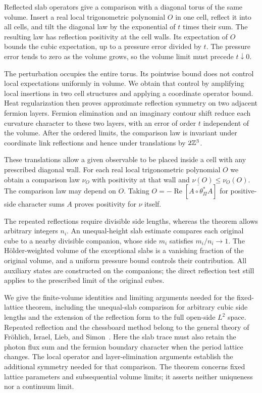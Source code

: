 Reflected slab operators give a comparison with a diagonal torus
of the same volume. Insert a real local trigonometric polynomial
$O$ in one cell, reflect it into all cells, and tilt the diagonal
law by the exponential of $t$ times their sum. The resulting law
has reflection positivity at the cell walls. Its expectation of
$O$ bounds the cubic expectation, up to a pressure error divided
by $t$. The pressure error tends to zero as the volume grows, so
the volume limit must precede $t\downarrow0$.

The perturbation occupies the entire torus. Its pointwise bound
does not control local expectations uniformly in volume. We obtain
that control by amplifying local insertions in two cell structures
and applying a coordinate operator bound. Heat regularization then
proves approximate reflection symmetry on two adjacent fermion
layers. Fermion elimination and an imaginary contour shift reduce
each curvature character to these two layers, with an error of
order $t$ independent of the volume. After the ordered limits,
the comparison law is invariant under coordinate link reflections
and hence under translations by $2\mathbb Z^3$.

These translations allow a given observable to be placed inside a
cell with any prescribed diagonal wall. For each real local
trigonometric polynomial $O$ we obtain a comparison law $\nu_O$
with positivity at that wall and
$\nu(O)\le\nu_O(O)$. The comparison law may depend on $O$.
Taking $O=-\operatorname{Re}[\overline{A\circ\theta_\Pi^*}A]$
for positive-side character sums $A$ proves positivity for $\nu$ itself.

The repeated reflections require divisible side lengths, whereas
the theorem allows arbitrary integers $n_i$. An unequal-height
slab estimate compares each original cube to a nearby divisible
companion, whose side $m_i$ satisfies $m_i/n_i\to1$. The H\"older-weighted
volume of the exceptional slabs is a vanishing fraction of the original
volume, and a uniform pressure bound controls their contribution. All auxiliary states
are constructed on the companions; the direct reflection test
still applies to the prescribed limit of the original cubes.


We give the finite-volume identities and limiting arguments needed
for the fixed-lattice theorem, including the unequal-slab comparison
for arbitrary cubic side lengths and the extension of the reflection
form to the full open-side $L^2$ space. Repeated reflection and the
chessboard method belong to the general theory of Fr\"ohlich, Israel,
Lieb, and Simon~\cite[Section~4]{FILS1978}. Here the slab trace must also
retain the photon flux sum and the fermion boundary character when
the period lattice changes. The local operator and layer-elimination
arguments establish the additional symmetry needed for that comparison.
The theorem concerns fixed lattice parameters and subsequential volume
limits; it asserts neither uniqueness nor a continuum limit.
